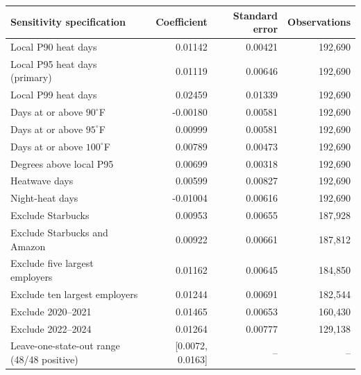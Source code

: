 \begin{tabular}{lrrr}
\toprule
Sensitivity specification & Coefficient & Standard error & Observations \\
\midrule
Local P90 heat days & 0.01142 & 0.00421 & 192,690 \\
Local P95 heat days (primary) & 0.01119 & 0.00646 & 192,690 \\
Local P99 heat days & 0.02459 & 0.01339 & 192,690 \\
Days at or above $90^\circ$F & -0.00180 & 0.00581 & 192,690 \\
Days at or above $95^\circ$F & 0.00999 & 0.00581 & 192,690 \\
Days at or above $100^\circ$F & 0.00789 & 0.00473 & 192,690 \\
Degrees above local P95 & 0.00699 & 0.00318 & 192,690 \\
Heatwave days & 0.00599 & 0.00827 & 192,690 \\
Night-heat days & -0.01004 & 0.00616 & 192,690 \\
Exclude Starbucks & 0.00953 & 0.00655 & 187,928 \\
Exclude Starbucks and Amazon & 0.00922 & 0.00661 & 187,812 \\
Exclude five largest employers & 0.01162 & 0.00645 & 184,850 \\
Exclude ten largest employers & 0.01244 & 0.00691 & 182,544 \\
Exclude 2020--2021 & 0.01465 & 0.00653 & 160,430 \\
Exclude 2022--2024 & 0.01264 & 0.00777 & 129,138 \\
\midrule
Leave-one-state-out range (48/48 positive) & [0.0072, 0.0163] & -- & -- \\
\bottomrule
\end{tabular}
